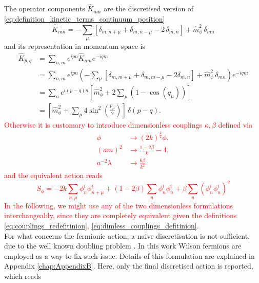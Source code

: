 The operator components $\widehat{K}_{mn}$ are the discretised version of \eqref{eq:definition_kinetic_terms_continuum_position}
\begin{equation}
    \widehat{K}_{mn} = - \sum_\mu \left[\delta_{m,n+\mu} + \delta_{m,n-\mu} - 2 \, \delta_{m,n}\right] + \widehat{m}_\phi^2 \, \delta_{mn} 
    \label{eq:discretised_kinetic_op_bosons}
\end{equation}
and its representation in momentum space is
\begin{equation*}
	\begin{aligned}
		\widehat{K}_{p, q} & =\sum_{n, m} e^{i p n} \widehat{K}_{n m} e^{-i q m} \\
		& =\sum_{n, m} e^{i p n}\left(-\sum_\mu\left[\delta_{m,m+\mu}+\delta_{m,m-\mu}-2 \delta_{m, n}\right] + \widehat{m}_\phi^2 \, \delta_{mn}\right) e^{-i q m} \\
		& =\sum_{n} e^{i(p-q) n}\left[\widehat{m}_\phi^2+2\sum_\mu \left(1-\cos \left(q_\mu\right)\right)\right] \\
		& = \left[\widehat{m}_\phi^2 + \sum_\mu 4 \sin ^2\left(\frac{p_\mu}{2}\right) \right] \, \delta(p-q) .
	\end{aligned}
\end{equation*}
\textcolor{red}{Otherwise it is customary to introduce dimensionless couplings $\kappa, \beta$ defined via
\begin{equation}
    \begin{aligned}
       \phi & \rightarrow(2 k)^{\frac{1}{2}} \phi, \\
        (a m)^2 & \rightarrow \frac{1-2 \beta}{k}-4, \\
        a^{-2} \lambda & \rightarrow \frac{6 \beta}{k^2}
    \end{aligned}
    \label{eq:dimless_couplings_defitinion}
\end{equation}
and the equivalent action reads
\begin{equation*}
    S_{\phi}=-2 k \sum_{n, \mu} \phi_n^i \phi_{n+\mu}^i+(1-2 \beta) \sum_n \phi_n^i \phi_n^i+\beta \sum_n\left(\phi_n^i \phi_n^i\right)^2
\end{equation*}
In the following, we might use any of the two dimensionless formulations interchangeably, since they are completely equivalent given the definitions \eqref{eq:couplings_redefitinion}, \eqref{eq:dimless_couplings_defitinion}.} \\
For what concerns the fermionic action, a naive discretisation is not sufficient, due to the well known doubling problem \cite{TROVA CITAZIONI}. In this work Wilson fermions \cite{wilson_lqcd} are employed as a way to fix such issue. Details of this formulation are explained in Appendix \ref{chap:AppendixB}. Here, only the final discretised action is reported, which reads
